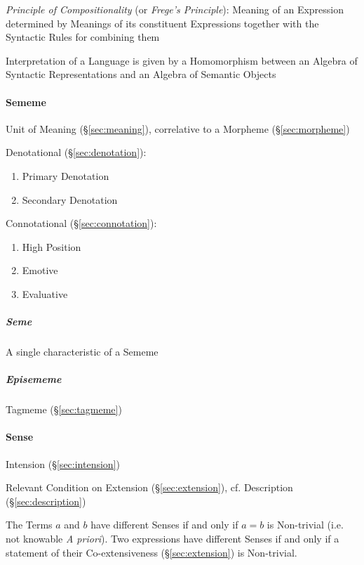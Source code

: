 \emph{Principle of Compositionality} (or \emph{Frege's Principle}):
Meaning of an Expression determined by Meanings of its constituent
Expressions together with the Syntactic Rules for combining them

Interpretation of a Language is given by a Homomorphism between an
Algebra of Syntactic Representations and an Algebra of Semantic
Objects



\paragraph{Sememe}\label{sec:sememe}\hfill

Unit of Meaning (\S\ref{sec:meaning}), correlative to a Morpheme
(\S\ref{sec:morpheme})

Denotational (\S\ref{sec:denotation}):

\begin{enumerate}
  \item Primary Denotation
  \item Secondary Denotation
\end{enumerate}

Connotational (\S\ref{sec:connotation}):

\begin{enumerate}
  \item High Position
  \item Emotive
  \item Evaluative
\end{enumerate}



\subparagraph{Seme}\label{sec:seme}\hfill

A single characteristic of a Sememe



\subparagraph{Episememe}\label{sec:episememe}\hfill

Tagmeme (\S\ref{sec:tagmeme})



\paragraph{Sense}\label{sec:sense}\hfill
\cite{chalmers02}

Intension (\S\ref{sec:intension})

Relevant Condition on Extension (\S\ref{sec:extension}), cf.
Description (\S\ref{sec:description})

The Terms $a$ and $b$ have different Senses if and only if $a = b$ is
Non-trivial (i.e. not knowable \emph{A priori}). Two expressions have
different Senses if and only if a statement of their Co-extensiveness
(\S\ref{sec:extension}) is Non-trivial.

